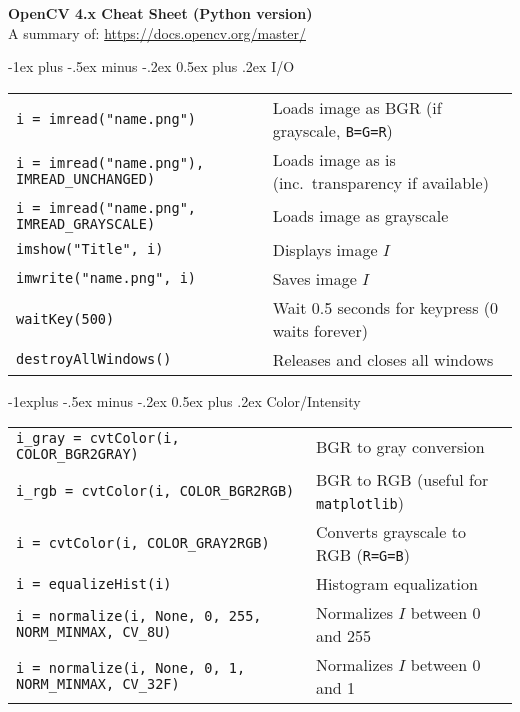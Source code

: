 \documentclass[10pt,landscape, a4paper]{article}
\makeatletter
\renewcommand{\section}{\@startsection{section}{1}{0mm}%
                                {-1ex plus -.5ex minus -.2ex}%
                                {0.5ex plus .2ex}%
                                {\normalfont\large\bfseries}}
\renewcommand{\subsection}{\@startsection{subsection}{2}{0mm}%
                                {-1explus -.5ex minus -.2ex}%
                                {0.5ex plus .2ex}%
                                {\normalfont\normalsize\bfseries}}
\makeatother
\begin{document}
\raggedright
\footnotesize
\begin{multicols}{2}


\setlength{\premulticols}{1pt}
\setlength{\postmulticols}{1pt}
\setlength{\multicolsep}{1pt}
\setlength{\columnsep}{2pt}

\begin{center}
     \Large{\textbf{OpenCV 4.x Cheat Sheet (Python version)}} \\
     \small{A summary of: \url{https://docs.opencv.org/master/}}
\end{center}

\section{I/O}
\begin{tabular}{@{}ll@{}}
\texttt{i = imread("name.png")}    & Loads image as BGR (if grayscale, \texttt{B=G=R})\\
\texttt{i = imread("name.png"), IMREAD_UNCHANGED)}    & Loads image as is (inc.\ transparency if available)\\
\texttt{i = imread("name.png", IMREAD_GRAYSCALE)} & Loads image as grayscale\\
\texttt{imshow("Title", i)} & Displays image $I$\\
\texttt{imwrite("name.png", i)} & Saves image $I$\\
\texttt{waitKey(500)} & Wait 0.5 seconds for keypress (0 waits forever)\\
\texttt{destroyAllWindows()} & Releases and closes all windows\\
\end{tabular}


\subsection{Color/Intensity}
\newlength{\MyLen}
\begin{tabular}{@{}ll@{}}
\texttt{i_gray = cvtColor(i, COLOR_BGR2GRAY)}& BGR to gray conversion\\
\texttt{i_rgb = cvtColor(i, COLOR_BGR2RGB)}& BGR to RGB (useful for \texttt{matplotlib})\\
\texttt{i = cvtColor(i, COLOR_GRAY2RGB)}& Converts grayscale to RGB (\texttt{R=G=B})\\
\texttt{i = equalizeHist(i)}& Histogram equalization\\
\texttt{i = normalize(i, None, 0, 255, NORM_MINMAX, CV_8U)} & Normalizes $I$ between 0 and 255\\
\texttt{i = normalize(i, None, 0, 1, NORM_MINMAX, CV_32F)} & Normalizes $I$ between 0 and 1
\end{tabular}

\end{multicols}
\end{document}
